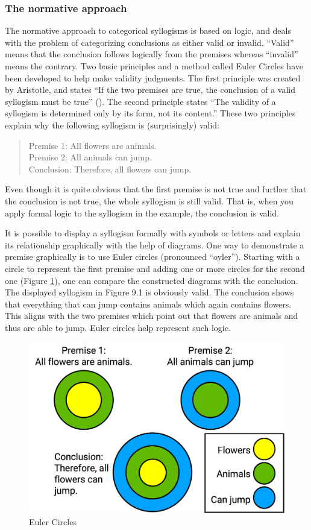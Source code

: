 \documentclass[
]{krantz}
\begin{document}
\subsubsection*{The normative approach}\label{the-normative-approach}


The normative approach to categorical syllogisms is based on logic, and deals with the problem of categorizing conclusions as either valid or invalid. ``Valid'' means that the conclusion follows logically from the premises whereas ``invalid'' means the contrary. Two basic principles and a method called Euler Circles have been developed to help make validity judgments. The first principle was created by Aristotle, and states ``If the two premises are true, the conclusion of a valid syllogism must be true'' (). The second principle states ``The validity of a syllogism is determined only by its form, not its content.'' These two principles explain why the following syllogism is (surprisingly) valid:

\begin{quote}
Premise 1: All flowers are animals.\\
Premise 2: All animals can jump.\\
Conclusion: Therefore, all flowers can jump.
\end{quote}

Even though it is quite obvious that the first premise is not true and further that the conclusion is not true, the whole syllogism is still valid. That is, when you apply formal logic to the syllogism in the example, the conclusion is valid.

It is possible to display a syllogism formally with symbols or letters and explain its relationship graphically with the help of diagrams. One way to demonstrate a premise graphically is to use Euler circles (pronounced ``oyler''). Starting with a circle to represent the first premise and adding one or more circles for the second one (Figure \ref{fig:euler}), one can compare the constructed diagrams with the conclusion. The displayed syllogism in Figure 9.1 is obviously valid. The conclusion shows that everything that can jump contains animals which again contains flowers. This aligns with the two premises which point out that flowers are animals and thus are able to jump. Euler circles help represent such logic.

\begin{figure}

{\centering \includegraphics[width=0.6\linewidth]{images/ch9/fig1} 

}

\caption{Euler Circles}\label{fig:euler}
\end{figure}
\end{document}
